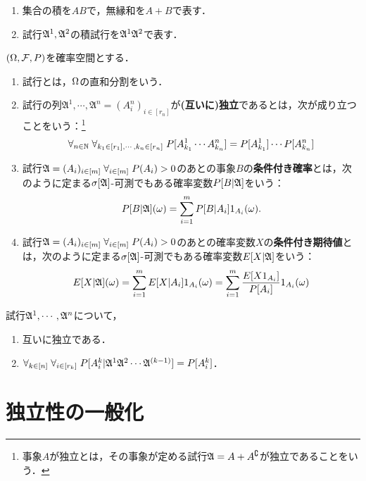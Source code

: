 \documentclass[uplatex,dvipdfmx]{jsreport}
\begin{document}
\begin{notation}\mbox{}
    \begin{enumerate}
        \item 集合の積を$AB$で，無縁和を$A+B$で表す．
        \item 試行$\mathfrak{A}^1,\mathfrak{A}^2$の積試行を$\mathfrak{A}^1\mathfrak{A}^2$で表す．
    \end{enumerate}
\end{notation}

\begin{definition}
    $(\Omega,\mathcal{F},P)$を確率空間とする．
    \begin{enumerate}
        \item 試行とは，$\Omega$の直和分割をいう．
        \item 試行の列$\mathfrak{A}^1,\cdots,\mathfrak{A}^n=(A^n_i)_{i\in[r_n]}$が\textbf{(互いに)独立}であるとは，次が成り立つことをいう：\footnote{事象$A$が独立とは，その事象が定める試行$\mathfrak{A}=A+A^\complement$が独立であることをいう．}
        \[\forall_{n\in\mathbb{N}}\;\forall_{k_1\in[r_1],\cdots,k_n\in[r_n]}\;P[A^1_{k_1}\cdots A^n_{k_n}]=P[A^1_{k_1}]\cdots P[A^n_{k_n}]\]
        \item 試行$\mathfrak{A}=(A_i)_{i\in[m]}\;\forall_{i\in[m]}\;P(A_i)>0$のあとの事象$B$の\textbf{条件付き確率}とは，次のように定まる$\sigma[\mathfrak{A}]$-可測でもある確率変数$P[B|\mathfrak{A}]$をいう：
        \[P[B|\mathfrak{A}](\omega)=\sum^m_{i=1}P[B|A_i]1_{A_i}(\omega).\]
        \item 試行$\mathfrak{A}=(A_i)_{i\in[m]}\;\forall_{i\in[m]}\;P(A_i)>0$のあとの確率変数$X$の\textbf{条件付き期待値}とは，次のように定まる$\sigma[\mathfrak{A}]$-可測でもある確率変数$E[X|\mathfrak{A}]$をいう：
        \[E[X|\mathfrak{A}](\omega)=\sum_{i=1}^mE[X|A_i]1_{A_i}(\omega)=\sum^m_{i=1}\frac{E[X1_{A_i}]}{P[A_i]}1_{A_i}(\omega)\]
    \end{enumerate}
\end{definition}

\begin{lemma}[独立性の条件付き期待値による特徴付け]
    試行$\mathfrak{A}^1,\cdots,\mathfrak{A}^n$について，
    \begin{enumerate}
        \item 互いに独立である．
        \item $\forall_{k\in[n]}\;\forall_{i\in[r_k]}\;P[A_i^k|\mathfrak{A}^1\mathfrak{A}^2\cdots\mathfrak{A}^{(k-1)}]=P[A_i^k]$．
    \end{enumerate}
\end{lemma}

\section{独立性の一般化}
\end{document}
